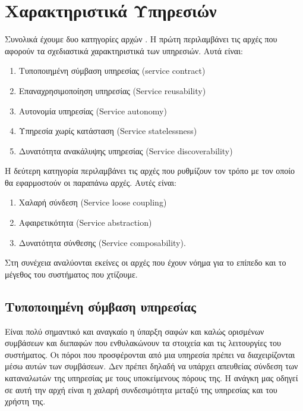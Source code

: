 \section{Χαρακτηριστικά Υπηρεσιών}

Συνολικά έχουμε δυο κατηγορίες αρχών \citep{Duggan2012}. Η πρώτη 
περιλαμβάνει τις αρχές που αφορούν τα σχεδιαστικά χαρακτηριστικά των 
υπηρεσιών. Αυτά είναι:

\begin{enumerate}
\item Τυποποιημένη σύμβαση υπηρεσίας (service contract)
\item Επαναχρησιμοποίηση υπηρεσίας (Service reusability)
\item Αυτονομία υπηρεσίας (Service autonomy)
\item Υπηρεσία χωρίς κατάσταση (Service statelessness)
\item Δυνατότητα ανακάλυψης υπηρεσίας (Service discoverability)
\setcounter{numberedCntI}{\theenumi}
\end{enumerate}

Η δεύτερη κατηγορία περιλαμβάνει τις αρχές που ρυθμίζουν τον τρόπο με 
τον οποίο θα εφαρμοστούν οι παραπάνω αρχές. Αυτές είναι:

\begin{enumerate}
\item Χαλαρή σύνδεση (Service loose coupling)
\item Αφαιρετικότητα (Service abstraction)
\item Δυνατότητα σύνθεσης (Service composability).
\setcounter{numberedCntJ}{\theenumi}
\end{enumerate}
Στη συνέχεια αναλύονται εκείνες οι αρχές που έχουν νόημα για το επίπεδο 
και το μέγεθος του συστήματος που χτίζουμε.

\subsection{Τυποποιημένη σύμβαση υπηρεσίας}

Είναι πολύ σημαντικό και αναγκαίο η ύπαρξη σαφών και καλώς 
ορισμένων συμβάσεων και διεπαφών που ενθυλακώνουν τα στοιχεία και τις 
λειτουργίες του συστήματος. Οι πόροι που προσφέρονται από μια υπηρεσία 
πρέπει να διαχειρίζονται μέσω αυτών των συμβάσεων. Δεν πρέπει δηλαδή να 
υπάρχει απευθείας σύνδεση των καταναλωτών της υπηρεσίας με τους 
υποκείμενους πόρους της. Η ανάγκη μας οδηγεί σε αυτή την αρχή είναι η 
χαλαρή συνδεσιμότητα μεταξύ της υπηρεσίας και του χρήστη της. 

